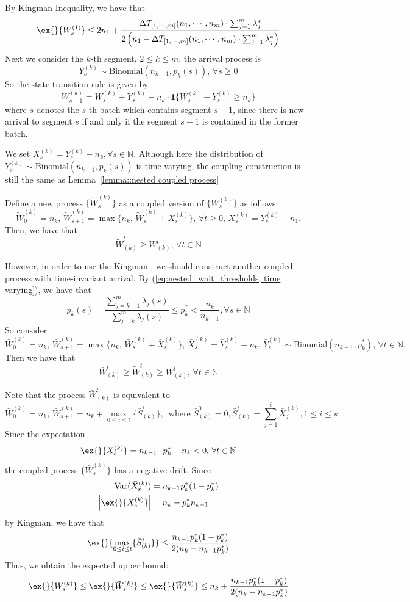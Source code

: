 By Kingman Inequality, we have that
$$  \ex{}{W^{(1)}_s}\leq  2n_1 + \frac{\Delta T_{ [1,\cdots,m]}(n_1,\cdots,n_m)\cdot \sum_{j=1}^m \lambda_j^*}{2\left(n_1 - \Delta T_{ [1,\cdots,m]}(n_1,\cdots,n_m)\cdot \sum_{j=1}^m \lambda_j^*\right)} $$
Next we consider the $k$-th segment, $2\leq k\leq m$, the arrival process is 
$$Y^{(k)}_s \sim \text{Binomial}(n_{k-1},p_k(s)),\, \forall s\geq 0$$
So the state transition rule is given by
$$W^{(k)}_{s+1} = W^{(k)}_{s} + Y^{(k)}_{s} - n_k \cdot\mathbf{1}\{ W^{(k)}_{s} + Y^{(k)}_{s}\geq n_k \} $$
where $s$ denotes the $s$-th batch which contains segment $s-1$, since there is new arrival to segment $s$ if and only if the segment $s-1$ is contained in the former batch.

We set $X^{(k)}_s  =  Y^{(k)}_s - n_k, \forall s\in \mathbb{N}$. Although here the distribution of $Y^{(k)}_s\sim \text{Binomial}(n_{k-1},p_k(s))$ is time-varying, the coupling construction is still the same as Lemma~\ref{lemma::nested coupled process}
\begin{lemma}\label{lemma: coupling, time varying}
Define a new process $\{ \tilde{W}^{(k)}_s\}$ as a coupled version of $\{  W^{(k)}_s \}$ as follows:
$$ \tilde{W}^{(k)}_0=n_k, \, \tilde{W}^{(k)}_{s+1} = \max\{ n_k, \, \tilde{W}^{(k)}_s+X^{(k)}_s\},\, \forall t\geq 0 ,\, X^{(k)}_s = Y^{(k)}_s - n_1. $$
Then, we have that 
$$ \tilde{W}^t_{(k)}\geq W^t_{(k)},\,\forall t\in \mathbb{N} $$
\end{lemma}
However, in order to use the Kingman , we should construct another coupled process with time-invariant arrival. By (\ref{eq:nested_wait_thresholds, time varying}), we have that 
$$p_k(s) = \frac{\sum_{j=k-1}^m \lambda_j(s) }{ \sum_{j=k}^m \lambda_j(s)}\leq p_k^* < \frac{n_k}{n_{k-1}}, \forall s\in\mathbb{N}$$
So consider
$$\bar{W}^{(k)}_0=n_k,\, \bar{W}^{(k)}_{s+1} = \max\{ n_k,\, \bar{W}^{(k)}_{s}+\bar{X}^{(k)}_s \}, \,\bar{X}^{(k)}_s =\bar{Y}^{(k)}_s  -n_k, \, \bar{Y}^{(k)}_s \sim \text{Binomial}(n_{k-1}, p_k^*),\,\forall t\in \mathbb{N}.  $$
Then we have that 
$$\bar{W}^t_{(k)}\geq \tilde{W}^t_{(k)}\geq W^t_{(k)},\,\forall t\in \mathbb{N} $$

Note that 
the process $\bar{W}^t_{(k)}$ is equivalent to 
$$ \bar{W}^{(k)}_0 = n_k,\, \bar{W}^{(k)}_{s+1} = n_k + \max_{0\leq i\leq t}\{ \bar{S}^{i}_{(k)} \} ,\, \text{ where }\bar{S}^{0}_{(k)}=0, \bar{S}^{i}_{(k)} = \sum_{j=1}^i \bar{X}^{(k)}_{j}, 1\leq i\leq s $$
Since the expectation
$$ \ex{}{\bar{X}^{(k)}_s} = n_{k-1}\cdot p_{k}^* - n_k <0,\, \forall t\in \mathbb{N} $$
the coupled process $\{\bar{W}^{(k)}_s \}$ has a negative drift. Since 
\begin{align*}
\text{Var}(\bar{X}^{(k)}_s)& = n_{k-1}p_k^*(1-p_k^*)\\
\left|\ex{}{\bar{X}^{(k)}_s}\right|&=n_k - p_k^* n_{k-1}
\end{align*}
by Kingman, we have that
$$\ex{}{\max_{0\leq i\leq t}\{ \bar{S}_{(k)}^i \}  }\leq  \frac{  n_{k-1}p_k^*(1-p_k^*) }{ 2(n_k - n_{k-1}p_k^*)} $$
Thus, we obtain the expected upper bound:
$$\ex{}{W^{(k)}_s}\leq \ex{}{\tilde{W}^{(k)}_s}\leq \ex{}{\bar{W}^{(k)}_s} \leq n_k + \frac{  n_{k-1}p_k^*(1-p_k^*) }{ 2(n_k - n_{k-1}p_k^*)}$$

